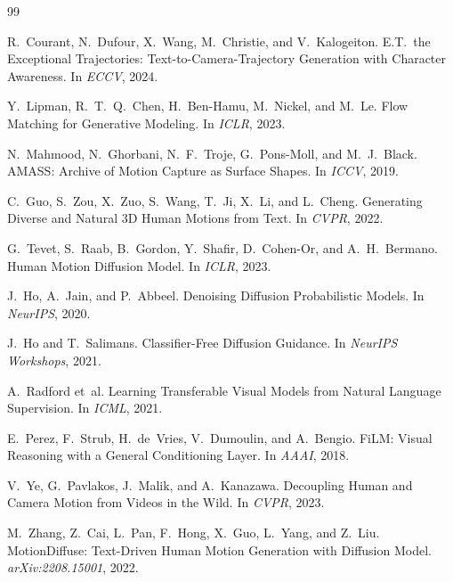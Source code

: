 \documentclass[10pt,twocolumn,letterpaper]{article}
\begin{document}
{\small

\begin{thebibliography}{99}

R.~Courant, N.~Dufour, X.~Wang, M.~Christie, and V.~Kalogeiton.
\newblock E.T.\ the Exceptional Trajectories: Text-to-Camera-Trajectory Generation with Character Awareness.
\newblock In \emph{ECCV}, 2024.

Y.~Lipman, R.~T.~Q.~Chen, H.~Ben-Hamu, M.~Nickel, and M.~Le.
\newblock Flow Matching for Generative Modeling.
\newblock In \emph{ICLR}, 2023.

N.~Mahmood, N.~Ghorbani, N.~F.~Troje, G.~Pons-Moll, and M.~J.~Black.
\newblock AMASS: Archive of Motion Capture as Surface Shapes.
\newblock In \emph{ICCV}, 2019.

C.~Guo, S.~Zou, X.~Zuo, S.~Wang, T.~Ji, X.~Li, and L.~Cheng.
\newblock Generating Diverse and Natural 3D Human Motions from Text.
\newblock In \emph{CVPR}, 2022.

G.~Tevet, S.~Raab, B.~Gordon, Y.~Shafir, D.~Cohen-Or, and A.~H.~Bermano.
\newblock Human Motion Diffusion Model.
\newblock In \emph{ICLR}, 2023.

J.~Ho, A.~Jain, and P.~Abbeel.
\newblock Denoising Diffusion Probabilistic Models.
\newblock In \emph{NeurIPS}, 2020.

J.~Ho and T.~Salimans.
\newblock Classifier-Free Diffusion Guidance.
\newblock In \emph{NeurIPS Workshops}, 2021.

A.~Radford et~al.
\newblock Learning Transferable Visual Models from Natural Language Supervision.
\newblock In \emph{ICML}, 2021.

E.~Perez, F.~Strub, H.~de~Vries, V.~Dumoulin, and A.~Bengio.
\newblock FiLM: Visual Reasoning with a General Conditioning Layer.
\newblock In \emph{AAAI}, 2018.

V.~Ye, G.~Pavlakos, J.~Malik, and A.~Kanazawa.
\newblock Decoupling Human and Camera Motion from Videos in the Wild.
\newblock In \emph{CVPR}, 2023.

M.~Zhang, Z.~Cai, L.~Pan, F.~Hong, X.~Guo, L.~Yang, and Z.~Liu.
\newblock MotionDiffuse: Text-Driven Human Motion Generation with Diffusion Model.
\newblock \emph{arXiv:2208.15001}, 2022.


\end{thebibliography}}
\end{document}
